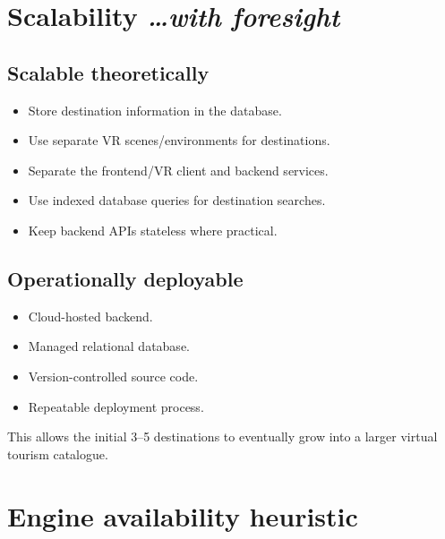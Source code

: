 \documentclass[11pt,a4paper]{article}
\newcommand{\BvrHint}[1]{%
  {\normalfont\normalsize\itshape\hfill #1}}
\begin{document}
\section{Scalability%
  \BvrHint{\ldots with foresight}}

\subsection{Scalable theoretically}

\begin{itemize}[leftmargin=0.7cm]
    \item Store destination information in the database.
    \item Use separate VR scenes/environments for destinations.
    \item Separate the frontend/VR client and backend services.
    \item Use indexed database queries for destination searches.
    \item Keep backend APIs stateless where practical.
\end{itemize}

\subsection{Operationally deployable}

\begin{itemize}[leftmargin=0.7cm]
    \item Cloud-hosted backend.
    \item Managed relational database.
    \item Version-controlled source code.
    \item Repeatable deployment process.
\end{itemize}

This allows the initial 3--5 destinations to eventually grow into a larger virtual tourism catalogue.

\section{Engine availability heuristic}
\end{document}

